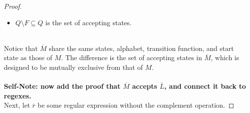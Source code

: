 \documentclass[12pt]{article}
\begin{document}
\begin{proof}
\begin{itemize}
        \item $Q \setminus F \subseteq Q$ is the set of accepting states.
    \end{itemize}
    \leavevmode\\
    Notice that $\overline{M}$ share the same states, alphabet, transition function, and start state as those of $M$. The difference is the set of accepting states in $\overline{M}$, which is designed to be mutually exclusive from that of $M$. \\
    \\
    \textbf{Self-Note: now add the proof that $\overline{M}$ accepts $\overline{L}$, and connect it back to regexes.}
    \\
    Next, let $\overline{r}$ be some regular expression without the complement operation.

\end{proof}
\pagebreak
\end{document}
